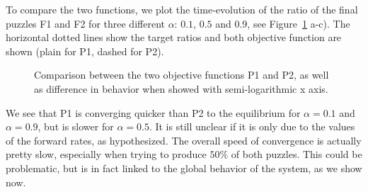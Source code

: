        To compare the two functions, we plot the time-evolution of the ratio of the final puzzles F1 and F2 for three different $\alpha$: $0.1$, $0.5$ and $0.9$, see Figure~\ref{fig:optim_objfct_comparison} a-c). The horizontal dotted lines show the target ratios and both objective function are shown (plain for P1, dashed for P2).

        \begin{figure}[h!]
            \caption{Comparison between the two objective functions P1 and P2, as well as difference in behavior when showed with semi-logarithmic x axis.}
        \label{fig:optim_objfct_comparison} %
        \end{figure}

        We see that P1 is converging quicker than P2 to the equilibrium for $\alpha=0.1$ and $\alpha=0.9$, but is slower for $\alpha=0.5$. It is still unclear if it is only due to the values of the forward rates, as hypothesized. The overall speed of convergence is actually pretty slow, especially when trying to produce $50\%$ of both puzzles. This could be problematic, but is in fact linked to the global behavior of the system, as we show now.


